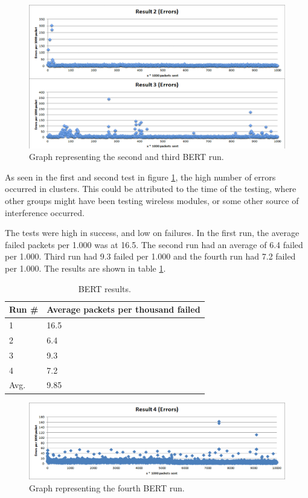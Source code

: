 \begin{figure}[h!]
\hspace*{-2cm}
\includegraphics[width=1.3\textwidth]{chapters/test/figures/res5.png}
\caption{Graph representing the second and third BERT run.}
\label{fig:bert2}
\end{figure}

As seen in the first and second test in figure \ref{fig:bert2}, the high number of errors occurred in clusters. This could be attributed to the time of the testing, where other groups might have been testing wireless modules, or some other source of interference occurred.

The tests were high in success, and low on failures. In the first run, the average failed packets per 1.000 was at 16.5. The second run had an average of 6.4 failed per 1.000. Third run had 9.3 failed per 1.000 and the fourth run had 7.2 failed per 1.000. The results are shown in table \ref{tab:bertresults}.

\begin{table}[ht!]
\centering
\begin{tabular}{ l l }
Run \# & Average packets per thousand failed \\
\hline
1 & 16.5 \\
2 & 6.4 \\
3 & 9.3 \\
4 & 7.2 \\
\hline
Avg. & 9.85
\end{tabular}

\label{tab:bertresults}
\caption{BERT results.}
\end{table}



\begin{figure}[h!]
\hspace*{-2cm}
\includegraphics[width=1.3\textwidth]{chapters/test/figures/res4.png}
\caption{Graph representing the fourth BERT run.}
\label{fig:bert3}
\end{figure}

